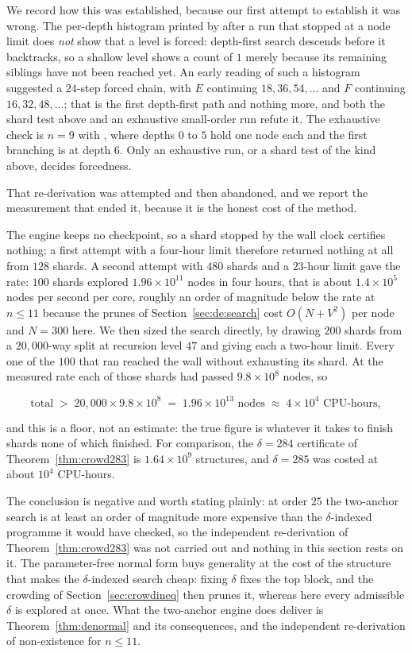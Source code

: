 We record how this was established, because our first attempt to establish it
was wrong.  The per-depth histogram printed by  after a run that
stopped at a node limit does \emph{not} show that a level is forced: depth-first
search descends before it backtracks, so a shallow level shows a count of $1$
merely because its remaining siblings have not been reached yet.  An early
reading of such a histogram suggested a $24$-step forced chain, with $E$
continuing $18,36,54,\dots$ and $F$ continuing $16,32,48,\dots$; that is the
first depth-first path and nothing more, and both the shard test above and an
exhaustive small-order run refute it.  The exhaustive check is $n=9$ with
, where depths $0$ to $5$ hold one node each and the first
branching is at depth $6$.  Only an exhaustive run, or a shard test of the kind
above, decides forcedness.

That re-derivation was attempted and then abandoned, and we report the
measurement that ended it, because it is the honest cost of the method.

The engine keeps no checkpoint, so a shard stopped by the wall clock certifies
nothing; a first attempt with a four-hour limit therefore returned nothing at
all from $128$ shards.  A second attempt with $480$ shards and a $23$-hour
limit gave the rate: $100$ shards explored $1.96\times10^{11}$ nodes in four
hours, that is about $1.4\times10^{5}$ nodes per second per core, roughly an
order of magnitude below the rate at $n\le11$ because the prunes of
Section~\ref{sec:de:search} cost $O(N+V^2)$ per node and $N=300$ here.  We then
sized the search directly, by drawing $200$ shards from a $20{,}000$-way split
at recursion level $47$ and giving each a two-hour limit.  Every one of the
$100$ that ran reached the wall without exhausting its shard.  At the measured
rate each of those shards had passed $9.8\times10^{8}$ nodes, so

\[
  \text{total} \;>\; 20{,}000 \times 9.8\times10^{8} \;=\; 1.96\times10^{13}
  \text{ nodes} \;\approx\; 4\times10^{4}\text{ CPU-hours},
\]

and this is a floor, not an estimate: the true figure is whatever it takes to
finish shards none of which finished.  For comparison, the $\delta=284$
certificate of Theorem~\ref{thm:crowd283} is $1.64\times10^{9}$ structures, and
$\delta=285$ was costed at about $10^4$ CPU-hours.

The conclusion is negative and worth stating plainly: at order $25$ the
two-anchor search is at least an order of magnitude more expensive than the
$\delta$-indexed programme it would have checked, so the independent
re-derivation of Theorem~\ref{thm:crowd283} was not carried out and nothing in
this section rests on it.  The parameter-free normal form buys generality at
the cost of the structure that makes the $\delta$-indexed search cheap: fixing
$\delta$ fixes the top block, and the crowding of Section~\ref{sec:crowdineq}
then prunes it, whereas here every admissible $\delta$ is explored at once.
What the two-anchor engine does deliver is Theorem~\ref{thm:denormal} and
its consequences, and the independent re-derivation of non-existence for
$n\le11$.

